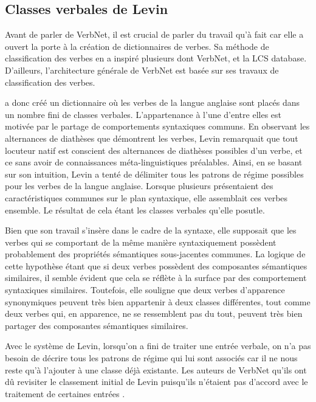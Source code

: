 \subsection{Classes verbales de Levin}

Avant de parler de VerbNet, il est crucial de parler du travail qu'à fait \cite{verb-classes.levin.1993} car elle a ouvert la porte à la création de dictionnaires de verbes. Sa méthode de classification des verbes en a inspiré plusieurs dont VerbNet\cite{SchulerVerbnetBroadcoverageComprehensive2005}, et la LCS database\citep{AyanGeneratingParsingLexicon2002a}\citep{DorrUseLexicalSemantics1992}. D'ailleurs, l'architecture générale de VerbNet est basée sur ses travaux de classification des verbes.

\cite{verb-classes.levin.1993} a donc créé un dictionnaire où les verbes de la langue anglaise sont placés dans un nombre fini de classes verbales. L'appartenance à l'une d'entre elles est motivée par le partage de comportements syntaxiques communs. En observant les alternances de diathèses que démontrent les verbes, Levin remarquait que tout locuteur natif est conscient des alternances de diathèses possibles d'un verbe, et ce sans avoir de connaissances méta-linguistiques préalables. Ainsi, en se basant sur son intuition, Levin a tenté de délimiter tous les patrons de régime possibles pour les verbes de la langue anglaise. Lorsque plusieurs présentaient des caractéristiques communes sur le plan syntaxique, elle assemblait ces verbes ensemble. Le résultat de cela étant les classes verbales qu'elle posutle.

Bien que son travail s'insère dans le cadre de la syntaxe, elle supposait que les verbes qui se comportant de la même manière syntaxiquement possèdent probablement des propriétés sémantiques sous-jacentes communes. La logique de cette hypothèse étant que si deux verbes possèdent des composantes sémantiques similaires, il semble évident que cela se réflète à la surface par des comportement syntaxiques similaires. Toutefois, elle souligne que deux verbes d'apparence synonymiques peuvent très bien appartenir à deux classes différentes, tout comme deux verbes qui, en apparence, ne se ressemblent pas du tout, peuvent très bien partager des composantes sémantiques similaires.

 Avec le système de Levin, lorsqu'on a fini de traiter une entrée verbale, on n'a pas besoin de décrire tous les patrons de régime qui lui sont associés car il ne nous reste qu'à l'ajouter à une classe déjà existante. Les auteurs de VerbNet qu'ils ont dû revisiter le classement initial de Levin puisqu'ils n'étaient pas d'accord avec le traitement de certaines entrées \citep{SchulerVerbnetBroadcoverageComprehensive2005}. 

